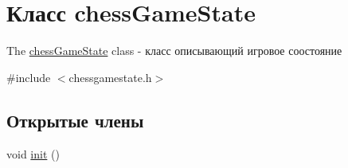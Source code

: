 \hypertarget{classchess_game_state}{}\section{Класс chess\+Game\+State}
\label{classchess_game_state}


The \hyperlink{classchess_game_state}{chess\+Game\+State} class -\/ класс описывающий игровое соостояние  




{\ttfamily \#include $<$chessgamestate.\+h$>$}

\subsection*{Открытые члены}
\begin{DoxyCompactItemize}
\item 
\hypertarget{classchess_game_state_a6cc0b8ba1e92e19ad235d1604ce3ff81}{}void \hyperlink{classchess_game_state_a6cc0b8ba1e92e19ad235d1604ce3ff81}{init} ()\label{classchess_game_state_a6cc0b8ba1e92e19ad235d1604ce3ff81}


\end{DoxyCompactItemize}
